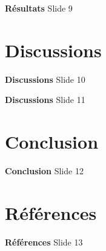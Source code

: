 \documentclass[aspectratio=169,10pt]{beamer}
\begin{document}
\begin{frame}{\textbf{Résultats}}
    Slide 9
\end{frame}

\section{Discussions}

\begin{frame}{\textbf{Discussions}}
    Slide 10
\end{frame}

\begin{frame}{\textbf{Discussions}}
    Slide 11
\end{frame}


\section{Conclusion}
\begin{frame}{\textbf{Conclusion}}
    Slide 12
\end{frame}


\section{Références}
\begin{frame}{\textbf{Références}}
    Slide 13
\end{frame}
\end{document}
